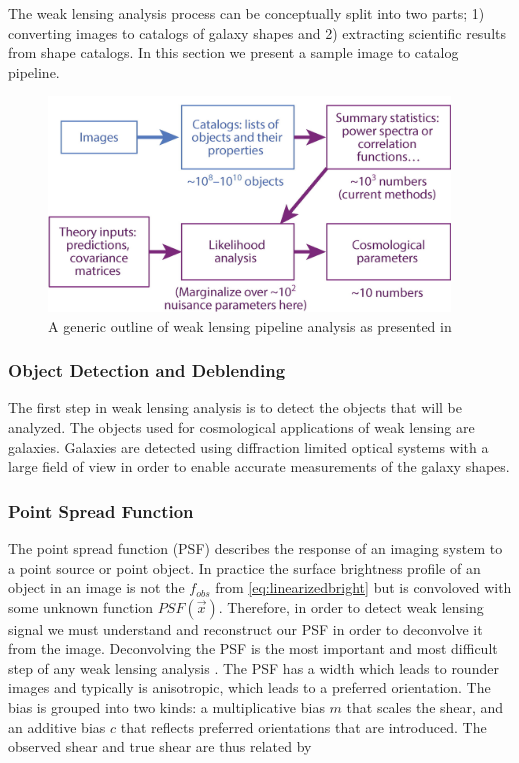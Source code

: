 The weak lensing analysis process can be conceptually split into two parts; 1) converting images to catalogs of galaxy shapes and 2) extracting scientific results from shape catalogs. In this section we present a sample image to catalog pipeline. 

\begin{figure}
    \begin{small}
        \begin{center}
            \includegraphics[width=0.95\textwidth]{figs/pipe.jpg}
        \end{center}
        \caption{A generic outline of weak lensing pipeline analysis as presented in \cite{rachel_2018}}
        \label{fig:pipe}
    \end{small}
\end{figure}


\subsubsection{Object Detection and Deblending}

The first step in weak lensing analysis is to detect the objects that will be analyzed. The objects used for cosmological applications of weak lensing are galaxies. Galaxies are detected using diffraction limited optical systems with a large field of view in order to enable accurate measurements of the galaxy shapes. 

\subsubsection{Point Spread Function}

The point spread function (PSF) describes the response of an imaging system to a point source or point object. In practice the surface brightness profile of an object in an image is not the $f_{obs}$ from \autoref{eq:linearizedbright} but is convoloved with some unknown function $PSF(\vec{x})$. Therefore, in order to detect weak lensing signal we must understand and reconstruct our PSF in order to deconvolve it from the image. Deconvolving the PSF is the most important and most difficult step of any weak lensing analysis \cite{Hoekstra:2013gua,rachel_2018}. The PSF has a width which leads to rounder images and typically is anisotropic, which leads to a preferred orientation. The bias is grouped into two kinds: a multiplicative bias $m$ that scales the shear, and an additive bias $c$ that reflects preferred orientations that are introduced. The observed shear and true shear are thus related by

